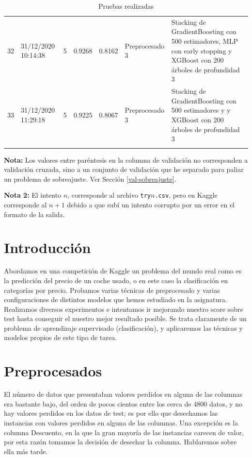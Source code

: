 \documentclass{article}
\begin{document}
\begin{longtable}{|c|C{2.1cm}|c|c|c|C{4cm}|C{6cm}|}
\midrule


32 & 31/12/2020 10:14:38 & 5 & 0.9268  & 0.8162 & Preprocesado 3 & Stacking de GradientBoosting con 500 estimadores, MLP con early stopping y XGBoost con 200 árboles de profundidad 3 \\

\midrule

33 & 31/12/2020 11:29:18 & 5 & 0.9225  & 0.8067 & Preprocesado 3 & Stacking de GradientBoosting con 500 estimadores y y XGBoost con 200 árboles de profundidad 3 \\

\bottomrule
\caption{Pruebas realizadas}
\label{tab:pruebas}
\end{longtable}

\textbf{Nota:} Los valores entre paréntesis en la columna de
validación no corresponden a validación cruzada, sino a un conjunto de
validación que he separado para paliar un problema de sobreajuste. Ver Sección \ref{val-sobreajuste}.

\textbf{Nota 2:} El intento $n$, corresponde al archivo
\texttt{try$n$.csv}, pero en Kaggle corresponde al $n+1$ debido a que
subí un intento corrupto por un error en el formato de la salida.

\pagebreak

\section{Introducción}

Abordamos en una competición de Kaggle un problema del mundo real como
es la predicción del precio de un coche usado, o en este caso la
clasificación en categorías por precio. Probamos varias técnicas de
preprocesado y varias configuraciones de distintos modelos que hemos
estudiado en la asignatura. Realizamos diversos experimentos e
intentamos ir mejorando nuestro score sobre test hasta conseguir el
nuestro mejor resultado posible. Se trata claramente de un problema de
aprendizaje supervisado (clasificación), y aplicaremos las técnicas y
modelos propios de este tipo de tarea.

\section{Preprocesados}

El número de datos que presentaban valores perdidos en alguna de las
columnas era bastante bajo, del orden de pocos cientos entre los cerca
de 4800 datos, y no hay valores perdidos en los datos de test; es por
ello que desechamos las instancias con valores perdidos en alguna de
las columnas. Una excepción es la columna Descuento, en la que la gran
mayoría de las instancias carecen de valor, por esta razón tomamos la
decisión de desechar la columna. Hablaremos sobre ella más tarde.
\end{document}
